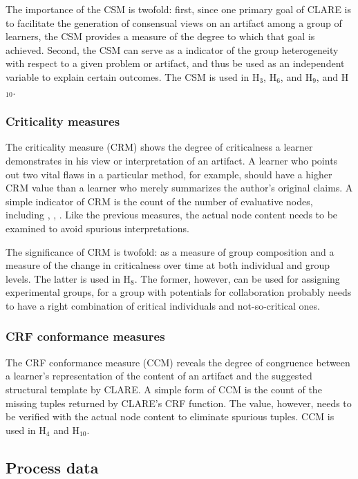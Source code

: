 The importance of the CSM is twofold: first, since one primary goal of
CLARE is to facilitate the generation of consensual views on an artifact
among a group of learners, the CSM provides a measure of the degree to
which that goal is achieved.  Second, the CSM can serve as a indicator of
the group heterogeneity with respect to a given problem or artifact, and
thus be used as an independent variable to explain certain outcomes.  The
CSM is used in {\sf H\(_3\)\/}, {\sf H\(_6\)\/}, and {\sf H\(_9\)\/}, and
{\sf H\(_{10}\)\/}.


\subsubsection{Criticality measures}

The criticality measure (CRM) shows the degree of criticalness a learner
demonstrates in his view or interpretation of an artifact.  A learner who
points out two vital flaws in a particular method, for example, should have
a higher CRM value than a learner who merely summarizes the author's
original claims.  A simple indicator of CRM is the count of the number of
evaluative nodes, including , ,
. Like the previous measures, the actual node
content needs to be examined to avoid spurious interpretations.

The significance of CRM is twofold: as a measure of group composition and a
measure of the change in criticalness over time at both individual and
group levels. The latter is used in {\sf H\(_8\)\/}. The former, however,
can be used for assigning experimental groups, for a group with potentials
for collaboration probably needs to have a right combination of critical
individuals and not-so-critical ones.


\subsubsection{CRF conformance measures}

The CRF conformance measure (CCM) reveals the degree of congruence between
a learner's representation of the content of an artifact and the suggested
structural template by CLARE. A simple form of CCM is the count of the
missing tuples returned by CLARE's CRF function. The value, however, needs
to be verified with the actual node content to eliminate spurious tuples.
CCM is used in {\sf H\(_4\)} and {\sf H\(_{10}\)}.


\subsection{Process data}
\label{sec:process data}

